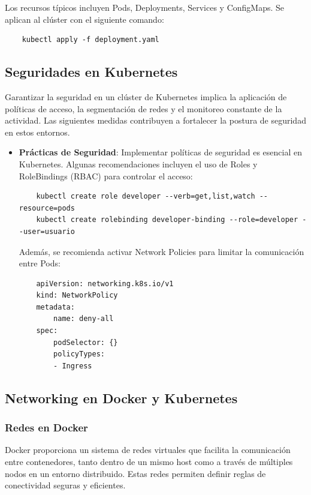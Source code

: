 {                Los recursos típicos incluyen Pods, Deployments, Services y ConfigMaps. Se aplican al clúster con el siguiente comando:
            
                \begin{verbatim}
    kubectl apply -f deployment.yaml
                \end{verbatim}
            
            \subsection{Seguridades en Kubernetes}
                Garantizar la seguridad en un clúster de Kubernetes implica la aplicación de políticas de acceso, la segmentación de redes y el monitoreo constante de la actividad. Las siguientes medidas contribuyen a fortalecer la postura de seguridad en estos entornos.

                \begin{itemize}
                    \item \textbf{Prácticas de Seguridad}: Implementar políticas de seguridad es esencial en Kubernetes. Algunas recomendaciones incluyen el uso de Roles y RoleBindings (RBAC) para controlar el acceso:
                
                    \begin{verbatim}
    kubectl create role developer --verb=get,list,watch --resource=pods
    kubectl create rolebinding developer-binding --role=developer --user=usuario
                    \end{verbatim}
                
                    Además, se recomienda activar Network Policies para limitar la comunicación entre Pods:
                
                    \begin{verbatim}
    apiVersion: networking.k8s.io/v1
    kind: NetworkPolicy
    metadata:
        name: deny-all
    spec:
        podSelector: {}
        policyTypes:
        - Ingress
                    \end{verbatim}
                \end{itemize}
                
            \subsection{Networking en Docker y Kubernetes}
            
            \subsubsection{Redes en Docker}
                Docker proporciona un sistema de redes virtuales que facilita la comunicación entre contenedores, tanto dentro de un mismo host como a través de múltiples nodos en un entorno distribuido. Estas redes permiten definir reglas de conectividad seguras y eficientes.
                
}
